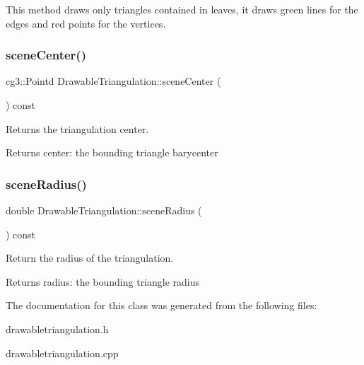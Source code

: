 This method draws only triangles contained in leaves, it draws green lines for the edges and red points for the vertices. \mbox{\label{classDrawableTriangulation_a3198ae77285c354fd020f5b18df718f5}} 
\subsubsection{\texorpdfstring{scene\+Center()}{sceneCenter()}}
{\footnotesize\ttfamily cg3\+::\+Pointd Drawable\+Triangulation\+::scene\+Center (\begin{DoxyParamCaption}{ }\end{DoxyParamCaption}) const}



Returns the triangulation center. 

\begin{DoxyReturn}{Returns}
center\+: the bounding triangle barycenter 
\end{DoxyReturn}
\mbox{\label{classDrawableTriangulation_a0aee9121b146c327dbbd741c3dc58c0a}} 
\subsubsection{\texorpdfstring{scene\+Radius()}{sceneRadius()}}
{\footnotesize\ttfamily double Drawable\+Triangulation\+::scene\+Radius (\begin{DoxyParamCaption}{ }\end{DoxyParamCaption}) const}



Return the radius of the triangulation. 

\begin{DoxyReturn}{Returns}
radius\+: the bounding triangle radius 
\end{DoxyReturn}


The documentation for this class was generated from the following files\+:\begin{DoxyCompactItemize}
\item 
drawabletriangulation.\+h\item 
drawabletriangulation.\+cpp\end{DoxyCompactItemize}
